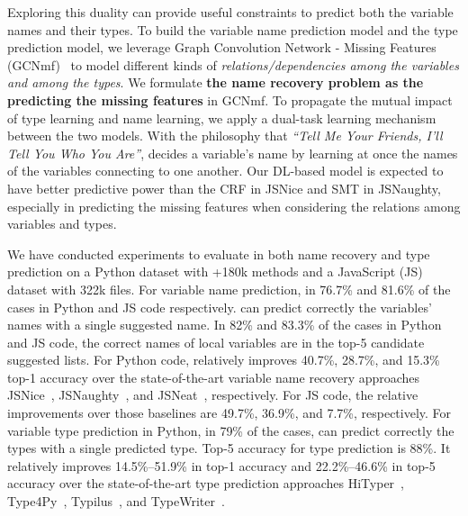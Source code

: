 %

Exploring this duality can provide useful constraints to predict both
the variable names and their types.  To build the variable name
prediction model and the type prediction model, we leverage Graph
Convolution Network - Missing Features (GCNmf)~\cite{GCNmf} to model
different kinds of {\em relations/dependencies among the variables and
  among the types}. We formulate {\bf the name recovery problem as the
  predicting the missing features} in GCNmf. To propagate the mutual
impact of type learning and name learning, we apply a dual-task
learning mechanism between the two models.
%
With the philosophy that {\em ``Tell Me Your Friends, I'll Tell You Who
  You Are''}, {\tool} decides a variable's name by learning at once
the names of the variables connecting to one another.
%
Our DL-based model is expected to have better predictive power than
the CRF in JSNice and SMT in JSNaughty, especially in predicting the
missing features when considering the relations among variables and
types.

We have conducted experiments to evaluate {\tool} in both name
recovery and type prediction on a Python dataset with +180k methods
and a JavaScript (JS) dataset with 322k files.
For variable name prediction, in 76.7\% and 81.6\%
of the cases in Python and JS code respectively.
{\tool} can predict correctly the variables' names with a single
suggested name. In 82\% and 83.3\%
of the cases in Python and JS code,
the correct names of local variables are in the top-5 candidate
suggested lists. For Python code, {\tool} relatively improves 40.7\%,
28.7\%, and 15.3\% top-1 accuracy over the state-of-the-art variable
name recovery approaches JSNice~\cite{JSNice2015},
JSNaughty~\cite{JSNaughty2017}, and JSNeat~\cite{icse19},
respectively. For JS code, the relative improvements over those
baselines are 49.7\%, 36.9\%, and 7.7\%, respectively.
%
%
For variable type prediction in Python, in 79\% of the cases, {\tool}
can predict correctly the types with a single predicted type. Top-5
accuracy for type prediction is 88\%. It relatively improves
14.5\%--51.9\% in top-1 accuracy and 22.2\%--46.6\% in top-5 accuracy
over the state-of-the-art type prediction approaches
HiTyper~\cite{HiTyper-icse22}, Type4Py~\cite{Type4Py-icse22},
Typilus~\cite{typilus-pldi20}, and TypeWriter~\cite{typewriter-fse20}.

